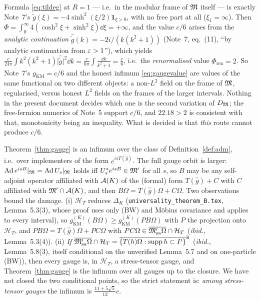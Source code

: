 \documentclass[11pt]{article}
\newcommand{\abs}[1]{\lvert#1\rvert}
\newcommand{\gKM}{g_{\mathrm{KM}}}\newcommand{\gB}{g_{\mathrm B}}
\newcommand{\HT}{\mathcal H_T}\newcommand{\Om}{\Omega}\newcommand{\one}{\mathbf 1}
\newcommand{\supp}{\operatorname{supp}}\newcommand{\Ad}{\operatorname{Ad}}
\begin{document}
\begin{remark}\label{rem:renorm}
Formula \eqref{eq:tildeg} at $R=1$ --- i.e.\ in the modular frame of $\mathfrak M$ itself --- is exactly Note~7's
$\tilde g(\xi)=-4\sinh^2(\xi/2)\one_{\xi>0}$, with no free part at all ($\xi_1=\infty$).  Then
$\Phi=\int_0^\infty4(\cosh^2\xi+\sinh^2\xi)\dd\xi=+\infty$, and the value $c/6$ arises from the
\emph{analytic continuation} $\hat{\tilde g}(k)=-2i/(k(k^2+1))$ (Note~7, eq.~(11), ``by analytic
continuation from $\varepsilon>1$''), which yields
$\frac c{24\pi}\int k^2(k^2+1)\abs{\hat{\tilde g}}^2\dd k=\frac c{6\pi}\int\frac{\dd k}{k^2+1}=\frac c6$,
i.e.\ the \emph{renormalised} value $\Phi_{\mathrm{ren}}=2$.  So Note~7's $\gKM=c/6$ and the honest
infimum \eqref{eq:gaugevalue} are values of the same functional on two different objects: a
non-$L^2$ field on the frame of $\mathfrak M$, regularised, versus honest $L^2$ fields on the frames of the
larger intervals.  Nothing in the present document decides which one is the second variation of
$D_{\mathfrak M}$; the free-fermion numerics of Note~5 support $c/6$, and $22.18>2$ is consistent with that,
monotonicity being an inequality.  What is decided is that \emph{this} route cannot produce $c/6$.
\end{remark}

\begin{remark}\label{rem:scope}
Theorem~\ref{thm:gauge} is an infimum over the class of Definition~\ref{def:adm}, i.e.\ over implementers of
the form $e^{is\overline{T(\hat g)}}$.  The full gauge orbit is larger: $\Ad e^{isB}|_{\cM}=\Ad U_s|_{\cM}$
holds iff $U_s^*e^{isB}\in\mathfrak M'$ for all $s$, so $B$ may be any self-adjoint operator affiliated with
$\mathcal A(K)$ of the (formal) form $T(\hat g)+C$ with $C$ affiliated with $\mathfrak M'\cap\mathcal A(K)$, and then
$B\Om=T(\hat g)\Om+C\Om$.  Two observations bound the damage.  (i) $\HT$ reduces $\Delta_K$
(\texttt{universality\_theorem\_B.tex}, Lemma~5.3(3), whose proof uses only (BW) and M\"obius covariance and
applies to every interval), so $\gKM^{(K)}(B\Om)\ge\gKM^{(K)}(PB\Om)$ with $P$ the projection onto $\HT$, and
$PB\Om=T(\hat g)\Om+PC\Om$ with $PC\Om\in\overline{\cM'_{\rm sa}\Om}\cap\HT$ (\emph{ibid.}, Lemma~5.3(4)).
(ii) \emph{If} $\overline{\cM'_{\rm sa}\Om}\cap\HT=\overline{\{T(h)\Om:\supp h\subset I'\}}^{\mathbb R}$
(\emph{ibid.}, Lemma~5.8(3), itself conditional on the unverified Lemma~5.7 and on one-particle (BW)), then
every gauge is, in $\HT$, a stress-tensor gauge, and Theorem~\ref{thm:gauge} is the infimum over all
gauges up to the closure.  We have not closed the two conditional points, so the strict statement is:
\emph{among stress-tensor gauges} the infimum is $\frac{11+5\sqrt5}{12}c$.
\end{remark}
\end{document}
